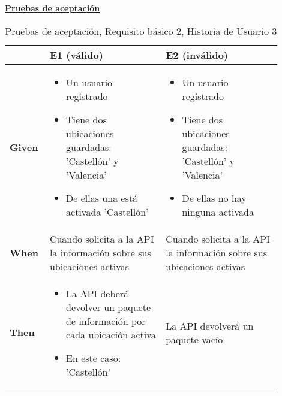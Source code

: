 \documentclass[../ei103948-project-documentation.tex]{subfiles}
\begin{document}
\begin{center}
					\textbf{\underline{Pruebas de aceptación}}
					\begin{table}[H]
						\centering
						\begin{tabular}{|p{0.10\linewidth}|p{0.40\linewidth}|p{0.40\linewidth}|}
							\hline
							\textbf{}      & \textbf{E1 (válido)}                                                                                                          & \textbf{E2 (inválido)}                                                                                                \\ \hline
							\textbf{Given} & 
							\begin{itemize}\vspace{-5mm}\setlength\itemsep{0mm}\setlength\parskip{0mm}\setlength{\itemindent}{-5mm}
								\item Un usuario registrado
								\item Tiene dos ubicaciones guardadas: 'Castellón' y 'Valencia'
								\item De ellas una está activada 'Castellón'
							\end{itemize} & \begin{itemize}\vspace{-5mm}\setlength\itemsep{0mm}\setlength\parskip{0mm}\setlength{\itemindent}{-5mm}
								\item Un usuario registrado
								\item Tiene dos ubicaciones guardadas: 'Castellón' y 'Valencia'
								\item De ellas no hay ninguna activada
							\end{itemize} \\ \hline
							\textbf{When}  & Cuando solicita a la API la información sobre sus ubicaciones activas                                                         & Cuando solicita a la API la información sobre sus ubicaciones activas                                                 \\ \hline
							\textbf{Then}  & \begin{itemize}\vspace{-5mm}\setlength\itemsep{0mm}\setlength\parskip{0mm}\setlength{\itemindent}{-5mm}
								\item La API deberá devolver un paquete de información por cada ubicación activa
								\item En este caso: 'Castellón'
							\end{itemize}& La API devolverá un paquete vacío                                                                                     \\ \hline
							\end{tabular}
						\caption{Pruebas de aceptación, Requisito básico 2, Historia de Usuario 3}
					\end{table}
					\end{center}
\end{document}
